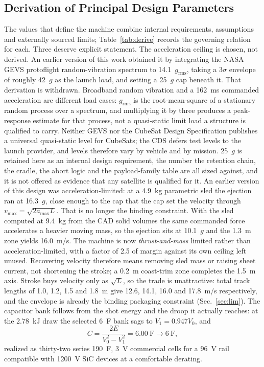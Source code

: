 \documentclass[conference]{IEEEtran}
\begin{document}
\subsection{Derivation of Principal Design Parameters}
The values that define the machine combine internal requirements, assumptions and externally sourced limits; Table~\ref{tab:derive} records the governing relation for each. Three deserve explicit statement. The acceleration ceiling is chosen, not derived. An earlier version of this work obtained it by integrating the NASA GEVS \cite{gevs} protoflight random-vibration spectrum to 14.1~$g_{\mathrm{rms}}$, taking a $3\sigma$ envelope of roughly 42~$g$ as the launch load, and setting a 25~$g$ cap beneath it. That derivation is withdrawn. Broadband random vibration and a 162~ms commanded acceleration are different load cases: $g_{\mathrm{rms}}$ is the root-mean-square of a stationary random process over a spectrum, and multiplying it by three produces a peak-response estimate for that process, not a quasi-static limit load a structure is qualified to carry. Neither GEVS nor the CubeSat Design Specification \cite{cds} publishes a universal quasi-static level for CubeSats; the CDS defers test levels to the launch provider, and levels therefore vary by vehicle and by mission. 25~$g$ is retained here as an internal design requirement, the number the retention chain, the cradle, the abort logic and the payload-family table are all sized against, and it is not offered as evidence that any satellite is qualified for it. An earlier version of this design was acceleration-limited: at a 4.9~kg parametric sled the ejection ran at 16.3~$g$, close enough to the cap that the cap set the velocity through $v_{\max}=\sqrt{2a_{\max}L}$. That is no longer the binding constraint. With the sled computed at 9.4~kg from the CAD solid volumes the same commanded force accelerates a heavier moving mass, so the ejection sits at 10.1~$g$ and the 1.3~m zone yields 16.0~m/s. The machine is now \emph{thrust-and-mass} limited rather than acceleration-limited, with a factor of 2.5 of margin against its own ceiling left unused. Recovering velocity therefore means removing sled mass or raising sheet current, not shortening the stroke; a 0.2~m coast-trim zone completes the 1.5~m axis. Stroke buys velocity only as $\sqrt{L}$, so the trade is unattractive: total track lengths of 1.0, 1.2, 1.5 and 1.8~m give 12.6, 14.1, 16.0 and 17.8~m/s respectively, and the envelope is already the binding packaging constraint (Sec.~\ref{sec:lim}). The capacitor bank follows from the shot energy and the droop it actually reaches: at the 2.78~kJ draw the selected 6~F bank sags to $V_1=0.947V_0$, and
\begin{equation}
C=\frac{2E}{V_0^2-V_1^2}=6.00~\mathrm{F}\rightarrow 6~\mathrm{F},
\end{equation}
realized as thirty-two series 190~F, 3~V commercial cells for a 96~V rail compatible with 1200~V SiC devices at a comfortable derating.
\end{document}
